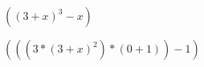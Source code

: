 \documentclass{proc}
\begin{document}
$( ( 3 + x ) ^ 3 - x ) $

$( ( ( 3 * ( 3 + x ) ^ 2 ) * ( 0 + 1 ) ) - 1 ) $
\end{document}
